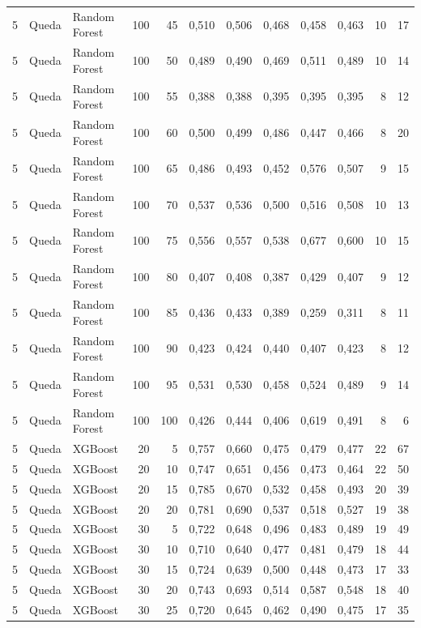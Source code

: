 \begin{longtable}{@{}rllrrrrrrrrr@{}}
5 & Queda & Random Forest & 100 & 45 & 0,510 & 0,506 & 0,468 & 0,458 & 0,463 & 10 & 17 \\
5 & Queda & Random Forest & 100 & 50 & 0,489 & 0,490 & 0,469 & 0,511 & 0,489 & 10 & 14 \\
5 & Queda & Random Forest & 100 & 55 & 0,388 & 0,388 & 0,395 & 0,395 & 0,395 & 8 & 12 \\
5 & Queda & Random Forest & 100 & 60 & 0,500 & 0,499 & 0,486 & 0,447 & 0,466 & 8 & 20 \\
5 & Queda & Random Forest & 100 & 65 & 0,486 & 0,493 & 0,452 & 0,576 & 0,507 & 9 & 15 \\
5 & Queda & Random Forest & 100 & 70 & 0,537 & 0,536 & 0,500 & 0,516 & 0,508 & 10 & 13 \\
5 & Queda & Random Forest & 100 & 75 & 0,556 & 0,557 & 0,538 & 0,677 & 0,600 & 10 & 15 \\
5 & Queda & Random Forest & 100 & 80 & 0,407 & 0,408 & 0,387 & 0,429 & 0,407 & 9 & 12 \\
5 & Queda & Random Forest & 100 & 85 & 0,436 & 0,433 & 0,389 & 0,259 & 0,311 & 8 & 11 \\
5 & Queda & Random Forest & 100 & 90 & 0,423 & 0,424 & 0,440 & 0,407 & 0,423 & 8 & 12 \\
5 & Queda & Random Forest & 100 & 95 & 0,531 & 0,530 & 0,458 & 0,524 & 0,489 & 9 & 14 \\
5 & Queda & Random Forest & 100 & 100 & 0,426 & 0,444 & 0,406 & 0,619 & 0,491 & 8 & 6 \\
5 & Queda & XGBoost & 20 & 5 & 0,757 & 0,660 & 0,475 & 0,479 & 0,477 & 22 & 67 \\
5 & Queda & XGBoost & 20 & 10 & 0,747 & 0,651 & 0,456 & 0,473 & 0,464 & 22 & 50 \\
5 & Queda & XGBoost & 20 & 15 & 0,785 & 0,670 & 0,532 & 0,458 & 0,493 & 20 & 39 \\
5 & Queda & XGBoost & 20 & 20 & 0,781 & 0,690 & 0,537 & 0,518 & 0,527 & 19 & 38 \\
5 & Queda & XGBoost & 30 & 5 & 0,722 & 0,648 & 0,496 & 0,483 & 0,489 & 19 & 49 \\
5 & Queda & XGBoost & 30 & 10 & 0,710 & 0,640 & 0,477 & 0,481 & 0,479 & 18 & 44 \\
5 & Queda & XGBoost & 30 & 15 & 0,724 & 0,639 & 0,500 & 0,448 & 0,473 & 17 & 33 \\
5 & Queda & XGBoost & 30 & 20 & 0,743 & 0,693 & 0,514 & 0,587 & 0,548 & 18 & 40 \\
5 & Queda & XGBoost & 30 & 25 & 0,720 & 0,645 & 0,462 & 0,490 & 0,475 & 17 & 35 \\

\end{longtable}
